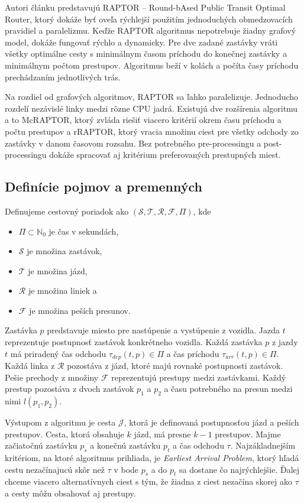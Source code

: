 Autori článku \cite{raptor} predstavujú RAPTOR – Round-bAsed Public Transit Optimal Router, ktorý dokáže byť oveľa rýchlejší použitím jednoduchých obmedzovacích pravidiel a paralelizmu. Keďže RAPTOR algoritmus nepotrebuje žiadny grafový model, dokáže fungovať rýchlo a dynamicky. Pre dve zadané zastávky vráti všetky optimálne cesty s minimálnym časom príchodu do konečnej zastávky a minimálnym počtom prestupov. Algoritmus beží v kolách a počíta časy príchodu prechádzaním jednotlivých trás.

Na rozdiel od grafových algoritmov, RAPTOR sa ľahko paralelizuje. Jednoducho rozdelí nezávislé linky medzi rôzne CPU jadrá. Existujú dve rozšírenia algoritmu a to McRAPTOR, ktorý zvláda riešiť viacero kritérií okrem času príchodu a počtu prestupov a rRAPTOR, ktorý vracia množinu ciest pre všetky odchody zo zastávky v danom časovom rozsahu. Bez potrebného pre-processingu a post-processingu dokáže spracovať aj kritérium preferovaných prestupných miest.

\subsection{Definície pojmov a premenných}
\label{sec:raptor-definitions}

Definujeme cestovný poriadok ako $(\mathcal{S,T,R,F},\Pi)$, kde 
\begin{itemize}
\setlength\itemsep{-0.3em}
\item $\Pi \subset \mathbb{N}_{0}$ je čas v sekundách, 
\item $\mathcal{S}$ je množina zastávok,
\item $\mathcal{T}$ je množina jázd, 
\item $\mathcal{R}$ je množina liniek a 
\item $\mathcal{F}$ je množina peších presunov.
\end{itemize}

Zastávka $p$ predstavuje miesto pre nastúpenie a vystúpenie z vozidla. Jazda $t$ reprezentuje postupnosť zastávok konkrétneho vozidla. Každá zastávka $p$ z jazdy $t$ má priradený čas odchodu $\tau_{dep}(t, p) \in \Pi$ a čas príchodu $\tau_{arr}(t, p) \in \Pi$. Každá linka z $\mathcal{R}$ pozostáva z jázd, ktoré majú rovnaké postupnosti zastávok. Pešie prechody z množiny $\mathcal{F}$ reprezentujú prestupy medzi zastávkami. Každý prestup pozostáva z dvoch zastávok $p_1$ a $p_2$ a času potrebného na presun medzi nimi $l(p_1, p_2)$. 

Výstupom z algoritmu je cesta $\mathcal{J}$, ktorá je definovaná postupnosťou jázd a peších prestupov. Cesta, ktorá obsahuje $k$ jázd, má presne $k-1$ prestupov. Majme začiatočnú zastávku $p_s$ a konečnú zastávku $p_t$ a čas odchodu $\tau$. Najzákladnejším kritériom, na ktoré algoritmus prihliada, je \textit{Earliest Arrival Problem}, ktorý hľadá cestu nezačínajucú skôr než $\tau$ v bode $p_s$ a do $p_t$ sa dostane čo najrýchlejšie. Ďalej chceme viacero alternatívnych ciest s tým, že žiadna z ciest nezačína skorej ako $\tau$ a cesty môžu obsahovať aj prestupy. 

